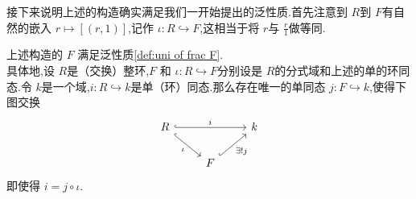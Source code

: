 \documentclass[lang=cn,12pt,color=green,fontset=none,pad]{elegantbook}
\begin{document}
接下来说明上述的构造确实满足我们一开始提出的泛性质.首先注意到 $ R $到 $ F $有自然的嵌入 $ r\mapsto [\left( r,1 \right) ]  $,记作 $ \iota :R\hookrightarrow F $,这相当于将 $ r $与 $ \frac{r}{1} $做等同.      
\begin{theorem}
    上述构造的 $ F $ 满足泛性质\ref{def:uni of frac F}.\\ 
     具体地,设 $ R $是（交换）整环,$  F $ 和 $ \iota: R\hookrightarrow F $分别设是 $ R $的分式域和上述的单的环同态.令 $ k $是一个域,$ i:R \hookrightarrow k $是单（环）同态.那么存在唯一的单同态 $ j: F\hookrightarrow k $,使得下图交换   
     \[\begin{tikzcd}
	R && k \\
	& F
	\arrow["i", hook, from=1-1, to=1-3]
	\arrow["\iota"', hook, from=1-1, to=2-2]
	\arrow["{\exists ! j}"', hook, from=2-2, to=1-3]
\end{tikzcd}\]
    即使得 $ i = j\circ \iota $. 
\end{theorem}
\end{document}
